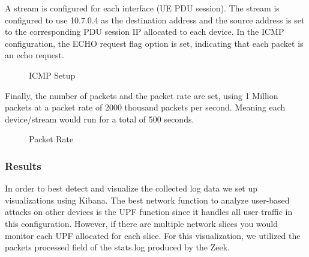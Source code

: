 \documentclass[final,1p,times,authoryear]{elsarticle}
\begin{document}
A stream is configured for each interface (UE PDU session). The stream is configured to use 10.7.0.4 as the destination address and the source address is set to the corresponding PDU session IP allocated to each device. In the ICMP configuration, the ECHO request flag option is set, indicating that each packet is an echo request.

\begin{figure}[H]
  \centering
  \caption{ICMP Setup}
  \label{fig:icmp-setup}
\end{figure}

Finally, the number of packets and the packet rate are set, using 1 Million packets at a packet rate of 2000 thousand packets per second. Meaning each device/stream would run for a total of 500 seconds.

\begin{figure}[H]
  \centering
  \caption{Packet Rate}
  \label{fig:port-group}
\end{figure}

\subsubsection{Results}
\label{sub4sub1sec2}
In order to best detect and visualize the collected log data we set up visualizations using Kibana. The best network function to analyze user-based attacks on other devices is the UPF function since it handles all user traffic in this configuration. However, if there are multiple network slices you would monitor each UPF allocated for each slice. For this visualization, we utilized the packets processed field of the stats.log produced by the Zeek.
\end{document}
